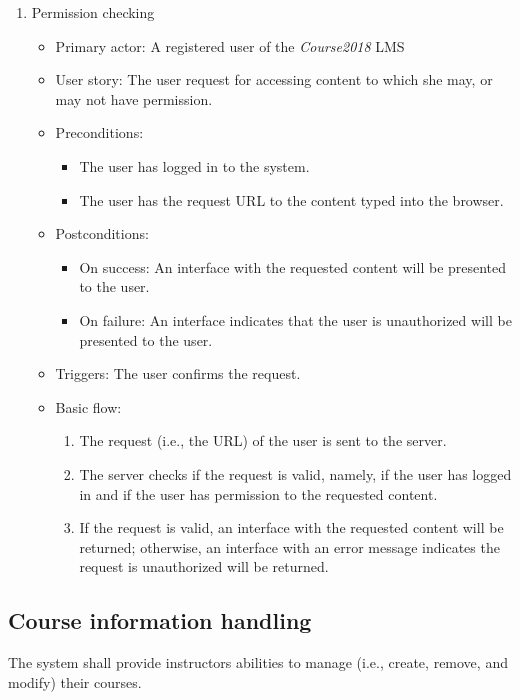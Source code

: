 \begin{enumerate}
\item Permission checking
\begin{itemize}
\item Primary actor: 
    A registered user of the \emph{Course2018} LMS
\item User story:
    The user request for accessing content to which she may, or may not have
    permission.
\item Preconditions:
    \begin{itemize}
        \item The user has logged in to the system.
        \item The user has the request URL to the content typed into the
            browser.
    \end{itemize}
\item Postconditions:
    \begin{itemize}
        \item On success: An interface with the requested content will be presented
            to the user.
        \item On failure: An interface indicates that the user is unauthorized will
            be presented to the user.
    \end{itemize}
\item Triggers: The user confirms the request.
\item Basic flow:
    \begin{enumerate}
        \item The request (i.e., the URL) of the user is sent to the server.
        \item The server checks if the request is valid, namely, if the user
            has logged in and if the user has permission to the requested
            content.
        \item If the request is valid, an interface with the requested content will
            be returned; otherwise, an interface with an error message indicates
            the request is unauthorized will be returned.
    \end{enumerate}
\end{itemize}

\end{enumerate}


\subsection{Course information handling}
The system shall provide instructors abilities to manage (i.e., create, remove,
and modify) their courses.
